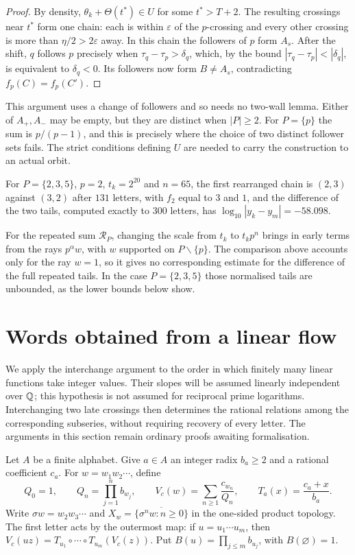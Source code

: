 \documentclass[11pt]{article}
\theoremstyle{remark}
\theoremstyle{plain}
\begin{document}
\begin{proof}
By density, $\theta_k+\Theta(t^*)\in U$ for some $t^*>T+2$. The resulting
crossings near $t^*$ form one chain: each is within $\varepsilon$ of
the $p$-crossing and every other crossing is more than
$\eta/2>2\varepsilon$ away. In this chain the followers of $p$ form
$A_s$. After the shift, $q$ follows $p$ precisely when
$\tau_q-\tau_p>\delta_q$, which, by the bound
$|\tau_q-\tau_p|<|\delta_q|$, is equivalent to $\delta_q<0$.
Its followers now form $B\ne A_s$, contradicting $f_p(C)=f_p(C')$.
\end{proof}

This argument uses a change of followers and so needs no two-wall lemma.
Either of $A_+,A_-$ may be empty, but they are distinct when $|P|\ge2$.
For $P=\{p\}$ the sum is $p/(p-1)$, and this is precisely where the choice
of two distinct follower sets fails. The strict conditions defining $U$
are needed to carry the construction to an actual orbit.

For $P=\{2,3,5\}$, $p=2$,
$t_k=2^{20}$ and $n=65$, the first rearranged chain is $(2,3)$ against
$(3,2)$ after $131$ letters, with $f_2$ equal to $3$ and $1$, and the
difference of the two tails, computed exactly to $300$ letters, has
$\log_{10}|y_k-y_m|=-58.098$.

For the repeated sum $\mathcal R_P$, changing the scale from $t_k$ to
$t_kp^n$ brings in early terms from the rays $p^\alpha w$, with $w$
supported on $P\smallsetminus\{p\}$. The comparison above accounts only for
the ray $w=1$, so it gives no corresponding estimate for the difference
of the full repeated tails. In the case $P=\{2,3,5\}$ those normalised
tails are unbounded, as the lower bounds below show.

\section{Words obtained from a linear flow}
\label{long269:sec:clock-transfer}

We apply the interchange argument to the order in which finitely many
linear functions take integer values. Their slopes will be assumed
linearly independent over $\mathbb{Q}$; this hypothesis is not assumed for
reciprocal prime logarithms. Interchanging two late crossings then
determines the rational relations among the corresponding subseries,
without requiring recovery of every letter. The arguments in this
section remain ordinary proofs awaiting formalisation.

Let $A$ be a finite alphabet.  Give $a\in A$ an integer radix $b_a\ge2$
and a rational coefficient $c_a$.  For $w=w_1w_2\cdots$, define
\[
 Q_0=1,\qquad Q_n=\prod_{j=1}^n b_{w_j},\qquad
 V_c(w)=\sum_{n\ge1}\frac{c_{w_n}}{Q_n},\qquad
 T_a(x)=\frac{c_a+x}{b_a}.
\]
Write $\sigma w=w_2w_3\cdots$ and
$X_w=\overline{\{\sigma^nw:n\ge0\}}$ in the one-sided product topology.
The first letter acts by the outermost map: if $u=u_1\cdots u_m$, then
$V_c(uz)=T_{u_1}\circ\cdots\circ T_{u_m}(V_c(z))$.  Put
$B(u)=\prod_{j\le m}b_{u_j}$, with $B(\varnothing)=1$.
\end{document}
